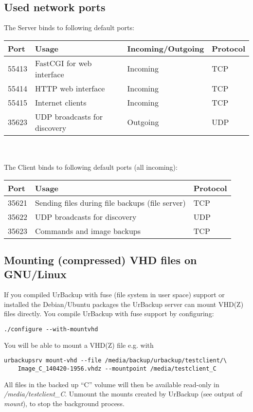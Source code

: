 \documentclass[a4paper,10pt]{article}
\begin{document}
\subsection{Used network ports}
\label{sec:ports}

The Server binds to following default ports:

\begin{tabular}{|p{}|p{}|p{}|p{}|}
\hline
\textbf{Port}  & \textbf{Usage} & \textbf{Incoming/Outgoing} & \textbf{Protocol} \\
\hline
55413 & FastCGI for web interface & Incoming & TCP\\
\hline
55414 & HTTP web interface & Incoming & TCP\\
\hline
55415 & Internet clients & Incoming & TCP\\
\hline
35623 & UDP broadcasts for discovery & Outgoing & UDP\\
\hline
\end{tabular}\\\\

\noindent The Client binds to following default ports (all incoming):

\begin{tabular}{|p{}|p{}|p{}|}
\hline
\textbf{Port}  & \textbf{Usage} & \textbf{Protocol} \\
\hline
35621 & Sending files during file backups (file server) & TCP\\
\hline
35622 & UDP broadcasts for discovery & UDP\\
\hline
35623 & Commands and image backups & TCP\\
\hline
\end{tabular}

\subsection{Mounting (compressed) VHD files on GNU/Linux}
\label{sec:mounting_image_files}

If you compiled UrBackup with fuse (file system in user space) support or
installed the Debian/Ubuntu packages the UrBackup server can mount 
VHD(Z) files directly. You compile UrBackup with fuse support by configuring:
\begin{verbatim}
./configure --with-mountvhd
\end{verbatim}
You will be able to mount a VHD(Z) file e.g. with
\begin{verbatim}
urbackupsrv mount-vhd --file /media/backup/urbackup/testclient/\
	Image_C_140420-1956.vhdz --mountpoint /media/testclient_C
\end{verbatim}
All files in the backed up ``C'' volume will then be available read-only in \textsl{/media/testclient\_C}.
Unmount the mounts created by UrBackup (see output of \textsl{mount}), to stop the background process.
\end{document}
